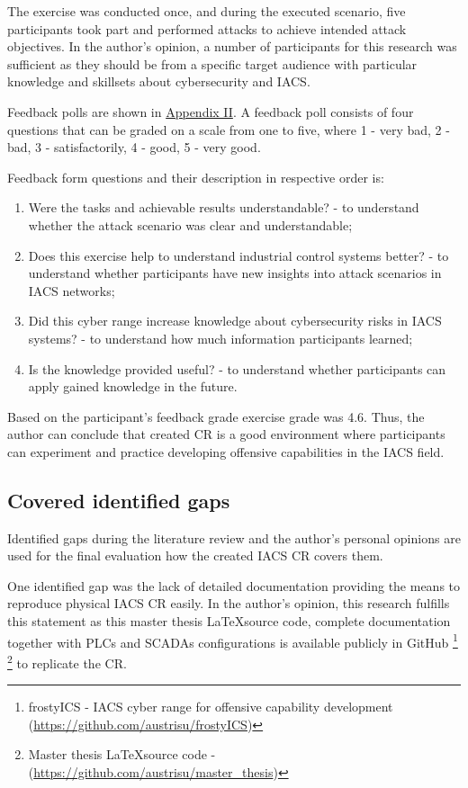 The exercise was conducted once, and during the executed scenario, five participants took part and performed attacks to achieve intended attack objectives. In the author's opinion, a number of participants for this research was sufficient as they should be from a specific target audience with particular knowledge and skillsets about cybersecurity and IACS.

Feedback polls are shown in \hyperlink{page.91}{Appendix II}. A feedback poll consists of four questions that can be graded on a scale from one to five, where 1 - very bad, 2 - bad, 3 - satisfactorily, 4 - good, 5 - very good. 

Feedback form questions and their description in respective order is:

\begin{enumerate}
	\item Were the tasks and achievable results understandable? - to understand whether the attack scenario was clear and understandable;
	
	\item Does this exercise help to understand industrial control systems better? - to understand whether participants have new insights into attack scenarios in IACS networks; 
	
	\item Did this cyber range increase knowledge about cybersecurity risks in IACS systems? - to understand how much information participants learned;
	
	\item Is the knowledge provided useful? - to understand whether participants can apply gained knowledge in the future. 
\end{enumerate}


Based on the participant's feedback grade exercise grade was 4.6. Thus, the author can conclude that created CR is a good environment where participants can experiment and practice developing offensive capabilities in the IACS field.

\subsection{Covered identified gaps}

Identified gaps during the literature review and the author's personal opinions are used for the final evaluation how the created IACS CR covers them.


One identified gap was the lack of detailed documentation providing the means to reproduce physical IACS CR easily. In the author's opinion, this research fulfills this statement as this master thesis \LaTeX source code, complete documentation together with PLCs and SCADAs configurations is available publicly in GitHub \footnote{frostyICS - IACS cyber range for offensive capability development (\url{https://github.com/austrisu/frostyICS})} \footnote{Master thesis \LaTeX source code - (\url{https://github.com/austrisu/master_thesis})}  to replicate the CR.


